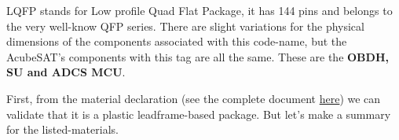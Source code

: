 \documentclass[final]{cubedoc}
\begin{document}
	
	LQFP stands for Low profile Quad Flat Package, it has 144 pins and belongs to the very well-know QFP series. There are slight variations for the physical dimensions of the components associated with this code-name, but the AcubeSAT's components with this tag are all the same. These are the \textbf{OBDH, SU and ADCS MCU}.
	
	First, from the material declaration (see the complete document \href{https://web.archive.org/web/20200818131830/https://www.st.com/content/ccc/resource/quality_and_reliability/quality_certificate/material_declaration/group3/be/7d/54/2a/11/68/4e/ad/DM00442253/files/P41A_470XXXY_signed.pdf/jcr:content/translations/en.P41A_470XXXY_signed.pdf}{here}) we can validate that it is a plastic leadframe-based package. But let's make a summary for the listed-materials.
	
	
\end{document}
